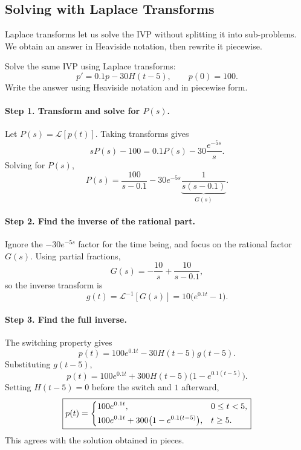\documentclass[10pt,letterpaper]{article}
\begin{document}
\subsection{Solving with Laplace Transforms}

Laplace transforms let us solve the IVP without splitting
it into sub-problems. We obtain an answer in Heaviside
notation, then rewrite it piecewise.

\begin{example}[2]{
Solve the same IVP using Laplace transforms:
\[
p'=0.1p-30H(t-5),\qquad p(0)=100.
\]
Write the answer using Heaviside notation and in piecewise form.
}

\paragraph{Step 1. Transform and solve for $P(s)$.}
Let $P(s)=\mathcal L[p(t)]$. Taking transforms gives
\[
sP(s)-100=0.1P(s)-30\frac{e^{-5s}}{s}.
\]
Solving for $P(s)$,
\[
P(s)=\frac{100}{s-0.1}
-30e^{-5s}
\underbrace{\frac{1}{s(s-0.1)}}_{G(s)}.
\]

\paragraph{Step 2. Find the inverse of the rational part.}
Ignore the $-30e^{-5s}$ factor for the time being, and focus on the rational factor $G(s)$. Using partial fractions,
\[
G(s)=-\frac{10}{s}+\frac{10}{s-0.1},
\]
so the inverse transform is
\[
g(t)=\mathcal L^{-1}[G(s)]
=10\bigl(e^{0.1t}-1\bigr).
\]

\paragraph{Step 3. Find the full inverse.}
The switching property gives
\[
p(t)=100e^{0.1t}-30H(t-5)g(t-5).
\]
Substituting $g(t-5)$,
\[
\boxed{
p(t)=100e^{0.1t}
+300H(t-5)\bigl(1-e^{0.1(t-5)}\bigr).
}
\]
Setting $H(t-5)=0$ before the switch and $1$ afterward,
\[
\boxed{
p(t)=
\begin{dcases}
100e^{0.1t}, & 0\le t<5,\\
100e^{0.1t}+300\bigl(1-e^{0.1(t-5)}\bigr),
& t\ge5.
\end{dcases}
}
\]
This agrees with the solution obtained in pieces.
\end{example}



\end{document}
